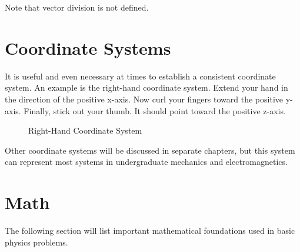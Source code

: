 \documentclass[a4paper, 11pt]{book}
\begin{document}
\noindent Note that vector division is not defined.

\newpage
\section{Coordinate Systems}
It is useful and even necessary at times to establish a consistent coordinate system.
An example is the right-hand coordinate system. Extend your hand in the direction of the positive x-axis.
Now curl your fingers toward the positive y-axis. Finally, stick out your thumb. It should point toward the
positive z-axis.

\begin{figure}[h]
\centering
{}
\caption{Right-Hand Coordinate System}
\end{figure}

\noindent Other coordinate systems will be discussed in separate chapters, but
this system can represent most systems in undergraduate mechanics and electromagnetics.

\section{Math}
The following section will list important mathematical foundations used in basic physics problems.
\end{document}
